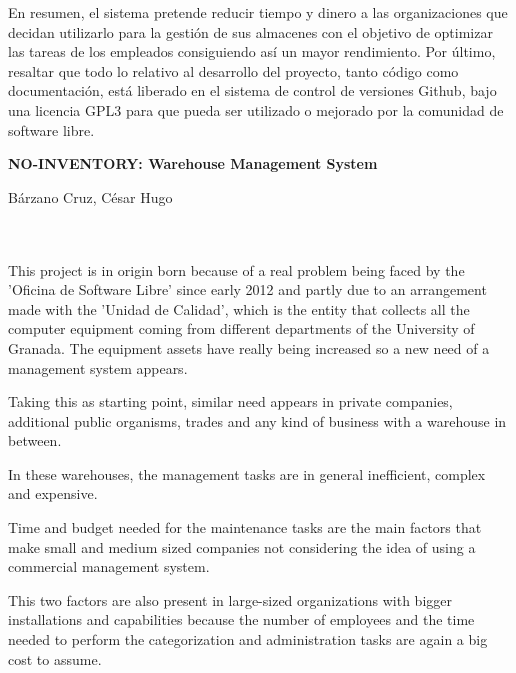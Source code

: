 En resumen, el sistema pretende reducir tiempo y dinero a las organizaciones que decidan utilizarlo para la gestión de sus almacenes con el objetivo  de optimizar las tareas de los empleados consiguiendo así un mayor rendimiento. 
Por último, resaltar que todo lo relativo al desarrollo del proyecto, tanto código como documentación, está liberado en el sistema de control de versiones Github, bajo una licencia GPL3 para que pueda ser utilizado o mejorado por la comunidad de software libre.


\cleardoublepage


\thispagestyle{empty}


\begin{center}
{\large\bfseries NO-INVENTORY: Warehouse Management System}\\
\end{center}
\begin{center}
Bárzano Cruz, César Hugo\\
\end{center}

\\

\vspace{0.7cm}
\\

This project is in origin born because of a real problem being faced by the 'Oficina de Software Libre' since early 2012 and partly due to an arrangement made with the 'Unidad de Calidad', which is the entity that collects all the computer equipment coming from different departments of the University of Granada. The equipment assets have really being increased so a new need of a management system appears.

Taking this as starting point, similar need appears in private companies, additional public organisms, trades and any kind of business with a warehouse in between.


In these warehouses, the management tasks are in general inefficient, complex and expensive.

Time and budget needed for the maintenance tasks are the main factors that make small and medium sized companies not considering the idea of using a commercial management system.


This two factors are also present in large-sized organizations with bigger installations and capabilities because the number of employees and the time needed to perform the categorization and administration tasks are again a big cost to assume.


